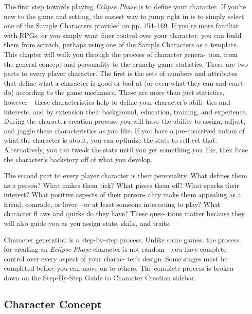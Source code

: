 The first step towards playing \textit{Eclipse Phase }is to 
define your character. If you're new to the game and 
setting, the easiest way to jump right in is to simply 
select one of the Sample Characters provided on pp. 
154–169. If you're more familiar with RPGs, or you 
simply want finer control over your character, you 
can build them from scratch, perhaps using one of the 
Sample Characters as a template. This chapter will 
walk you through the process of character genera-
tion, from the general concept and personality to the 
crunchy game statistics.
There are two parts to every player character. The 
first is the sets of numbers and attributes that define 
what a character is good or bad at (or even what they 
can and can't do) according to the game mechanics. 
These are more than just statistics, however—these 
characteristics help to define your character's abili-
ties and interests, and by extension their background, 
education, training, and experience. During the 
character creation process, you will have the ability 
to assign, adjust, and juggle these characteristics as 
you like. If you have a pre-conceived notion of what 
the character is about, you can optimize the stats to 
refl ect that. Alternatively, you can tweak the stats until 
you get something you like, then base the character's 
backstory off of what you develop.

The second part to every player character is their 
personality. What defines them as a person? What 
makes them tick? What pisses them off? What sparks 
their interest? What positive aspects of their person-
ality make them appealing as a friend, comrade, or 
lover—or at least someone interesting to play? What 
character fl aws and quirks do they have? These ques-
tions matter because they will also guide you as you 
assign stats, skills, and traits.

Character generation is a step-by-step process. 
Unlike some games, the process for creating an 
\textit{Eclipse Phase} character is not random—you have 
complete control over every aspect of your charac-
ter's design. Some stages must be completed before 
you can move on to others. The complete process is 
broken down on the Step-By-Step Guide to Character 
Creation sidebar.

\subsection{Character Concept}

